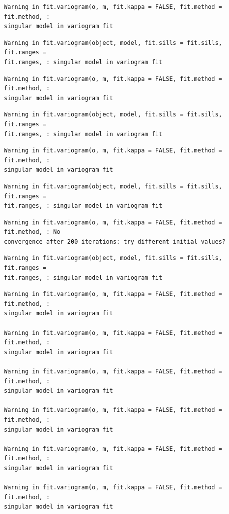 \documentclass[
  letterpaper,
  DIV=11,
  numbers=noendperiod]{scrartcl}
\begin{document}
\begin{verbatim}
Warning in fit.variogram(o, m, fit.kappa = FALSE, fit.method = fit.method, :
singular model in variogram fit
\end{verbatim}

\begin{verbatim}
Warning in fit.variogram(object, model, fit.sills = fit.sills, fit.ranges =
fit.ranges, : singular model in variogram fit
\end{verbatim}

\begin{verbatim}
Warning in fit.variogram(o, m, fit.kappa = FALSE, fit.method = fit.method, :
singular model in variogram fit
\end{verbatim}

\begin{verbatim}
Warning in fit.variogram(object, model, fit.sills = fit.sills, fit.ranges =
fit.ranges, : singular model in variogram fit
\end{verbatim}

\begin{verbatim}
Warning in fit.variogram(o, m, fit.kappa = FALSE, fit.method = fit.method, :
singular model in variogram fit
\end{verbatim}

\begin{verbatim}
Warning in fit.variogram(object, model, fit.sills = fit.sills, fit.ranges =
fit.ranges, : singular model in variogram fit
\end{verbatim}

\begin{verbatim}
Warning in fit.variogram(o, m, fit.kappa = FALSE, fit.method = fit.method, : No
convergence after 200 iterations: try different initial values?
\end{verbatim}

\begin{verbatim}
Warning in fit.variogram(object, model, fit.sills = fit.sills, fit.ranges =
fit.ranges, : singular model in variogram fit
\end{verbatim}

\begin{verbatim}
Warning in fit.variogram(o, m, fit.kappa = FALSE, fit.method = fit.method, :
singular model in variogram fit

Warning in fit.variogram(o, m, fit.kappa = FALSE, fit.method = fit.method, :
singular model in variogram fit

Warning in fit.variogram(o, m, fit.kappa = FALSE, fit.method = fit.method, :
singular model in variogram fit

Warning in fit.variogram(o, m, fit.kappa = FALSE, fit.method = fit.method, :
singular model in variogram fit

Warning in fit.variogram(o, m, fit.kappa = FALSE, fit.method = fit.method, :
singular model in variogram fit

Warning in fit.variogram(o, m, fit.kappa = FALSE, fit.method = fit.method, :
singular model in variogram fit
\end{verbatim}
\end{document}
